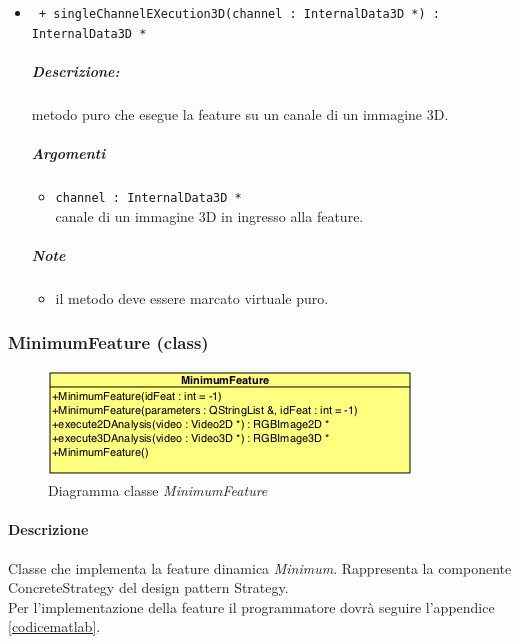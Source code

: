 \begin{itemize}
	\item \color{blue}\verb! + singleChannelEXecution3D(channel : InternalData3D *) : InternalData3D *!
		\color{black}
		\subparagraph{Descrizione:} metodo puro che esegue la feature su un canale di un immagine 3D.
		\subparagraph{Argomenti}
			\begin{itemize}
				\item \color{RoyalPurple} \verb!channel : InternalData3D * ! \\ 
				\color{black} canale di un immagine 3D in ingresso alla feature.		
			\end{itemize}
		\subparagraph{Note}
			\begin{itemize}
				\item il metodo deve essere marcato virtuale puro.
			\end{itemize}
			
	\end{itemize}
	
\color{black}
\pagebreak
\subsubsection{MinimumFeature (class)}
\label{MinimumFeature}
\begin{figure}[!h]
\centering
			\includegraphics[scale=1]{./Content/Immagini/modelCore/MinimumFeature.png}
			\caption{Diagramma classe \textsl{MinimumFeature}}
			\label{MinimumFeature_img}
\end{figure}

\paragraph{Descrizione \\} Classe che implementa la feature\g{} dinamica \textit{Minimum}. Rappresenta la componente ConcreteStrategy del design pattern\g{} Strategy.
\\Per l'implementazione della feature\g{} il programmatore dovrà seguire l'appendice \ref{codicematlab}.

